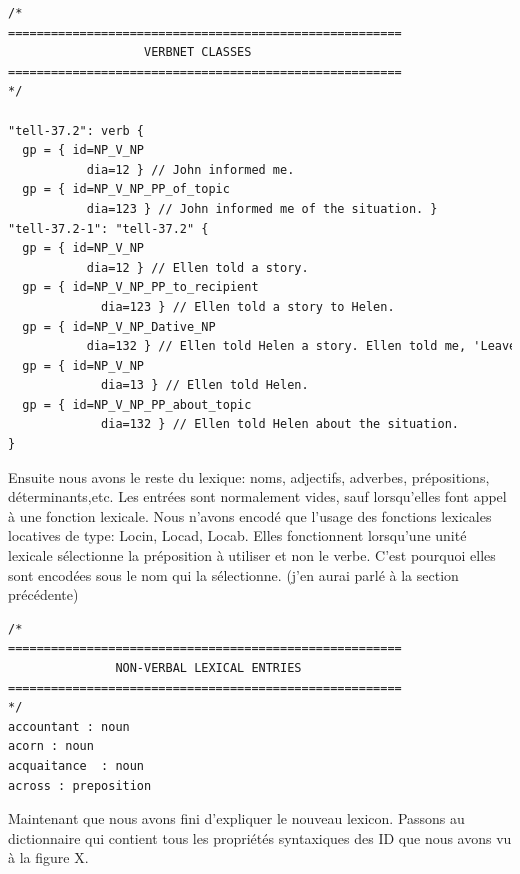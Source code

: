 \begin{lstlisting}[language=XML, caption = Partie: Classes de VerbNet]
/*
=======================================================
                   VERBNET CLASSES
=======================================================
*/

"tell-37.2": verb {
  gp = { id=NP_V_NP  
	       dia=12 } // John informed me.
  gp = { id=NP_V_NP_PP_of_topic  
	       dia=123 } // John informed me of the situation. }
"tell-37.2-1": "tell-37.2" {
  gp = { id=NP_V_NP  
	       dia=12 } // Ellen told a story.
  gp = { id=NP_V_NP_PP_to_recipient 
		     dia=123 } // Ellen told a story to Helen.
  gp = { id=NP_V_NP_Dative_NP   
	       dia=132 } // Ellen told Helen a story. Ellen told me, 'Leave the room.'
  gp = { id=NP_V_NP
		     dia=13 } // Ellen told Helen.
  gp = { id=NP_V_NP_PP_about_topic
		     dia=132 } // Ellen told Helen about the situation.
}
\end{lstlisting}

Ensuite nous avons le reste du lexique: noms, adjectifs, adverbes, prépositions, déterminants,etc. Les entrées sont normalement vides, sauf lorsqu'elles font appel à une fonction lexicale. Nous n'avons encodé que l'usage des fonctions lexicales locatives de type: Locin, Locad, Locab. Elles fonctionnent lorsqu'une unité lexicale sélectionne la préposition à utiliser et non le verbe. C'est pourquoi elles sont encodées sous le nom qui la sélectionne. (j'en aurai parlé à la section précédente)

\begin{lstlisting}[language=XML, caption = Partie: Unités lexicales non-verbales]
/*
=======================================================
               NON-VERBAL LEXICAL ENTRIES     
=======================================================
*/
accountant : noun
acorn : noun
acquaitance  : noun
across : preposition
\end{lstlisting}

Maintenant que nous avons fini d'expliquer le nouveau lexicon. Passons au dictionnaire qui contient tous les propriétés syntaxiques des ID que nous avons vu à la figure X.

